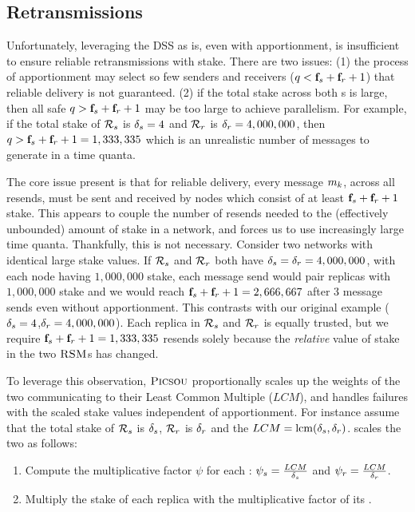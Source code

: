 %
\subsection{Retransmissions}

Unfortunately, leveraging the DSS as is, even with apportionment, is insufficient to ensure reliable retransmissions with stake. There are two issues:
(1) the process of apportionment may select so few senders and receivers ($q<\textbf{f}_{s}+\textbf{f}_{r}+1$) that reliable delivery is not guaranteed.
(2) if the total stake across both \RSM{}s is large, then all safe $q > \textbf{f}_{s}+\textbf{f}_{r}+1$ may be too large to achieve parallelism. For example, if the total stake of \RSM{} $\mathcal{R}_{s}$ is ${\delta}_{s} = 4$ and \RSM{} $\mathcal{R}_{r}$ is ${\delta}_{r} = 4,000,000$, then 
$q>\textbf{f}_{s}+\textbf{f}_{r}+1 = 1,333,335$ which is an unrealistic number of messages to generate in a time quanta.

The core issue present is that for reliable delivery, every message $m_k$, across all resends, must be sent and received by nodes which consist of at least $\textbf{f}_{s}+\textbf{f}_{r}+1$ stake. This appears to couple the number of resends needed to the (effectively unbounded) amount of stake in a network, and forces us to use increasingly large time quanta. Thankfully, this is not necessary. Consider two networks with identical large stake values. If $\mathcal{R}_{s}$ and $\mathcal{R}_{r}$ both have ${\delta}_{s}={\delta}_{r}=4,000,000$, with each node having $1,000,000$ stake, each message send would pair replicas with $1,000,000$ stake and we would reach $\textbf{f}_{s}+\textbf{f}_{r}+1=2,666,667$ after 3 message sends even without apportionment. This contrasts with our original example (${\delta}_{s} = 4$,${\delta}_{r} = 4,000,000$). Each replica in $\mathcal{R}_{s}$ and $\mathcal{R}_{r}$ is equally trusted, but we require $\textbf{f}_{s}+\textbf{f}_{r}+1 = 1,333,335$ resends solely because the \textit{relative} value of stake in the two $\textsc{RSM}{}$s has changed.

To leverage this observation, $\textsc{Picsou}{}$ proportionally scales up the weights of the two communicating  to
their Least Common Multiple ($LCM$), and handles failures with the scaled stake values independent of apportionment.
For instance assume that the total stake of \RSM{} $\mathcal{R}_{s}$ is ${\delta}_{s}$, \RSM{} $\mathcal{R}_{r}$ is ${\delta}_{r}$ and the $LCM = \operatorname{lcm}({\delta}_{s}, {\delta}_{r})$. 
\Scrooge{} scales the two  as follows:
\begin{enumerate}[nosep]
    \item Compute the multiplicative factor $\psi$ for each \RSM{}: $\psi_s = \frac{LCM}{{\delta}_{s}}$ and $\psi_r = \frac{LCM}{{\delta}_{r}}$.
    \item Multiply the stake of each replica with the multiplicative factor of its \RSM{}.
\end{enumerate}

